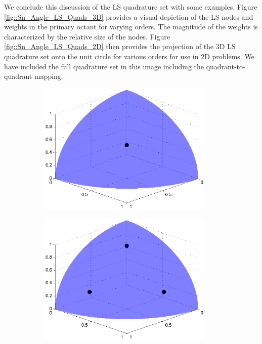We conclude this discussion of the LS quadrature set with some examples. Figure \ref{fig::Sn_Angle_LS_Quads_3D} provides a visual depiction of the LS nodes and weights in the primary octant for varying orders. The magnitude of the weights is characterized by the relative size of the nodes. Figure \ref{fig::Sn_Angle_LS_Quads_2D} then provides the projection of the 3D LS quadrature set onto the unit circle for various orders for use in 2D problems. We have included the full quadrature set in this image including the quadrant-to-quadrant mapping. 

\begin{figure}
\centering
	\begin{subfigure}[b]{0.48\textwidth}
		\centering
		\includegraphics[width=0.92\textwidth]{figures/sec_Sn/LS2_3D.eps}
		\caption{}
	\end{subfigure}
	\hfill
	\begin{subfigure}[b]{0.48\textwidth}
		\centering
		\includegraphics[width=0.92\textwidth]{figures/sec_Sn/LS4_3D.eps}

\end{subfigure}
\end{figure}

